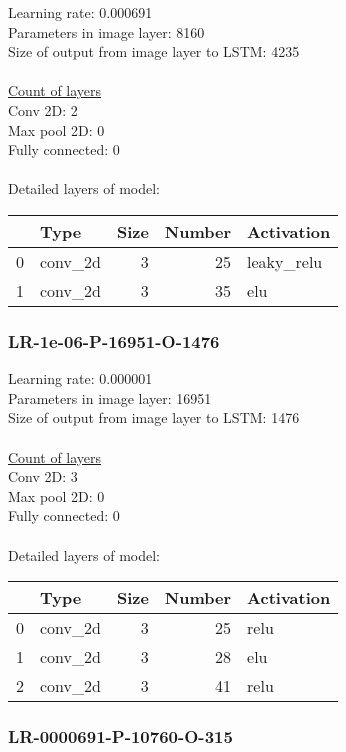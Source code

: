 Learning rate: 0.000691
\\Parameters in image layer: 8160
\\Size of output from image layer to LSTM: 4235
\\\\\underline{Count of layers} 
\\Conv 2D:           2\\Max pool 2D:      0\\Fully connected:  0
\\\\Detailed layers of model: \\\begin{tabular}{rlrrl}
\hline
    & Type    &   Size &   Number & Activation   \\
\hline
  0 & conv\_2d &      3 &       25 & leaky\_relu   \\
  1 & conv\_2d &      3 &       35 & elu          \\
\hline
\end{tabular}\subsubsection*{LR-1e-06-P-16951-O-1476}
Learning rate: 0.000001
\\Parameters in image layer: 16951
\\Size of output from image layer to LSTM: 1476
\\\\\underline{Count of layers} 
\\Conv 2D:           3\\Max pool 2D:      0\\Fully connected:  0
\\\\Detailed layers of model: \\\begin{tabular}{rlrrl}
\hline
    & Type    &   Size &   Number & Activation   \\
\hline
  0 & conv\_2d &      3 &       25 & relu         \\
  1 & conv\_2d &      3 &       28 & elu          \\
  2 & conv\_2d &      3 &       41 & relu         \\
\hline
\end{tabular}\subsubsection*{LR-0000691-P-10760-O-315}
